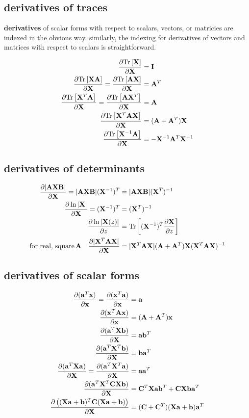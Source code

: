 \documentclass[12pt]{article}
\begin{document}
\subsection{derivatives of traces}
\noindent \textbf{derivatives}
of scalar forms with respect to scalars, vectors, or
matricies are indexed in the obvious way. similarly, the indexing for
derivatives of vectors and matrices with respect to scalars is
straightforward.

\begin{align}
\frac{\partial \trace{\XX}}{\partial \XX} &= \II \\
\frac{\partial \trace{\XX \AA}}{\partial \XX} =
\frac{\partial \trace{\AA \XX}}{\partial \XX} &= \AA^T\\
\frac{\partial \trace{\XX^T \AA}}{\partial \XX} =
\frac{\partial \trace{\AA \XX^T}}{\partial \XX} &= \AA\\
\frac{\partial \trace{\XX^T\AA \XX}}{\partial \XX} &= (\AA+\AA^T)\XX \\
\frac{\partial \trace{\XX^{-1} \AA}}{\partial \XX} &= 
-\XX^{-1} \AA^T \XX^{-1}
\end{align}

\subsection{derivatives of determinants}
\begin{align}
\frac{\partial |\AA\XX\BB|}{\partial \XX} = |\AA\XX\BB|(\XX^{-1})^T &=
|\AA\XX\BB|(\XX^T)^{-1}\\
\frac{\partial \ln |\XX|}{\partial \XX} = (\XX^{-1})^T &= (\XX^T)^{-1}\\
\frac{\partial \ln |\XX(z)|}{\partial z} &=
\trace{(\XX^{-1})^T\frac{\partial \XX}{\partial z}} \\
\text{for real, square} \thinspace \AA \quad 
\frac{\partial |\XX^T\AA\XX|}{\partial \XX} &=
|\XX^T\AA\XX|(\AA+\AA^T)\XX(\XX^T\AA\XX)^{-1} 
\end{align}

\subsection{derivatives of scalar forms}
\begin{align}
\frac{\partial (\aaa^T \xx)}{\partial \xx} = 
\frac{\partial (\xx^T \aaa)}{\partial \xx} &= \aaa \\
\frac{\partial (\xx^T\AA\xx)}{\partial \xx} &= (\AA + \AA^T)\xx \\ 
\frac{\partial (\aaa^T\XX\bb)}{\partial \XX} &= \aaa\bb^T  \\
\frac{\partial (\aaa^T\XX^T\bb)}{\partial \XX} &= \bb\aaa^T  \\
\frac{\partial (\aaa^T\XX\aaa)}{\partial \XX} = 
\frac{\partial (\aaa^T\XX^T\aaa)}{\partial \XX} &= \aaa\aaa^T \\
\frac{\partial (\aaa^T\XX^T\CC\XX\bb)}{\partial \XX} &= 
\CC^T\XX\aaa\bb^T + \CC\XX\bb\aaa^T \\
\frac{\partial \left((\XX\aaa+\bb)^T\CC(\XX\aaa+\bb)\right)}{\partial \XX} &= 
(\CC+\CC^T)(\XX\aaa+\bb)\aaa^T
\end{align}
\end{document}

